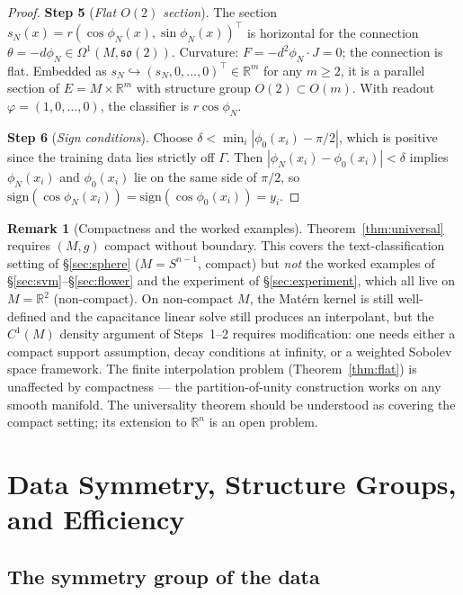 \documentclass[11pt, a4paper]{article}
\theoremstyle{plain}
\theoremstyle{definition}
\newtheorem{remark}[theorem]{Remark}
\newcommand{\R}{\mathbb{R}}
\begin{document}
\begin{proof}
\textbf{Step 5} (\emph{Flat $O(2)$ section}). \;
The section $s_N(x) = r(\cos\phi_N(x), \sin\phi_N(x))^\top$ is horizontal for the
connection $\theta = -d\phi_N \in \Omega^1(M, \mathfrak{so}(2))$.  Curvature:
$F = -d^2\phi_N\cdot J = 0$; the connection is flat.  Embedded as
$s_N \hookrightarrow (s_N, 0,\ldots,0)^\top \in \R^m$ for any $m \geq 2$, it is
a parallel section of $E = M \times \R^m$ with structure group $O(2) \subset O(m)$.
With readout $\varphi = (1,0,\ldots,0)$, the classifier is $r\cos\phi_N$.

\textbf{Step 6} (\emph{Sign conditions}). \;
Choose $\delta < \min_i |\phi_0(x_i) - \pi/2|$, which is positive since the
training data lies strictly off $\Gamma$.  Then $|\phi_N(x_i) - \phi_0(x_i)| < \delta$
implies $\phi_N(x_i)$ and $\phi_0(x_i)$ lie on the same side of $\pi/2$, so
$\mathrm{sign}(\cos\phi_N(x_i)) = \mathrm{sign}(\cos\phi_0(x_i)) = y_i$.
\end{proof}

\begin{remark}[Compactness and the worked examples]\label{rem:compactness}
Theorem~\ref{thm:universal} requires $(M,g)$ compact without boundary. This covers
the text-classification setting of \S\ref{sec:sphere} ($M = S^{n-1}$, compact) but
\emph{not} the worked examples of \S\ref{sec:svm}--\S\ref{sec:flower} and the
experiment of \S\ref{sec:experiment}, which all live on $M = \R^2$ (non-compact).
On non-compact $M$, the Matérn kernel is still well-defined and the capacitance
linear solve still produces an interpolant, but the $C^1(M)$ density argument of
Steps~1--2 requires modification: one needs either a compact support assumption,
decay conditions at infinity, or a weighted Sobolev space framework. The finite
interpolation problem (Theorem~\ref{thm:flat}) is unaffected by compactness ---
the partition-of-unity construction works on any smooth manifold. The universality
theorem should be understood as covering the compact setting; its extension to
$\R^n$ is an open problem.
\end{remark}

\section{Data Symmetry, Structure Groups, and Efficiency}\label{sec:symmetry}

\subsection{The symmetry group of the data}
\end{document}
